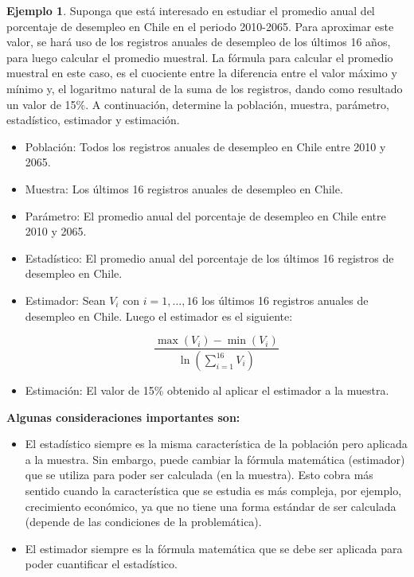 \documentclass[
  11pt,
]{book}
\providecommand{\tightlist}{%
  \setlength{\itemsep}{0pt}\setlength{\parskip}{0pt}}
\theoremstyle{definition}
\theoremstyle{definition}
\newtheorem{example}{Ejemplo}[chapter]
\theoremstyle{definition}
\theoremstyle{definition}
\theoremstyle{remark}
\begin{document}
\begin{example}

Suponga que está interesado en estudiar el promedio anual del porcentaje de desempleo en Chile en el periodo 2010-2065. Para aproximar este valor, se hará uso de los registros anuales de desempleo de los últimos 16 años, para luego calcular el promedio muestral. La fórmula para calcular el promedio muestral en este caso, es el cuociente entre la diferencia entre el valor máximo y mínimo y, el logaritmo natural de la suma de los registros, dando como resultado un valor de 15\%. A continuación, determine la población, muestra, parámetro, estadístico, estimador y estimación.

\begin{itemize}
\item
  Población: Todos los registros anuales de desempleo en Chile entre 2010 y 2065.
\item
  Muestra: Los últimos 16 registros anuales de desempleo en Chile.
\item
  Parámetro: El promedio anual del porcentaje de desempleo en Chile entre 2010 y 2065.
\item
  Estadístico: El promedio anual del porcentaje de los últimos 16 registros de desempleo en Chile.
\item
  Estimador: Sean \(V_i\) con \(i=1,\ldots,16\) los últimos 16 registros anuales de desempleo en Chile. Luego el estimador es el siguiente:

  \[
  \frac{\max(V_i) - \min(V_i)}{\ln\left(\displaystyle\sum_{i=1}^{16} V_i\right)}
  \]
\item
  Estimación: El valor de 15\% obtenido al aplicar el estimador a la muestra.
\end{itemize}

\textbf{Algunas consideraciones importantes son:}

\begin{itemize}
\tightlist
\item
  El estadístico siempre es la misma característica de la población pero aplicada a la muestra. Sin embargo, puede cambiar la fórmula matemática (estimador) que se utiliza para poder ser calculada (en la muestra). Esto cobra más sentido cuando la característica que se estudia es más compleja, por ejemplo, crecimiento económico, ya que no tiene una forma estándar de ser calculada (depende de las condiciones de la problemática).
\item
  El estimador siempre es la fórmula matemática que se debe ser aplicada para poder cuantificar el estadístico.
\end{itemize}

\end{example}
\end{document}
